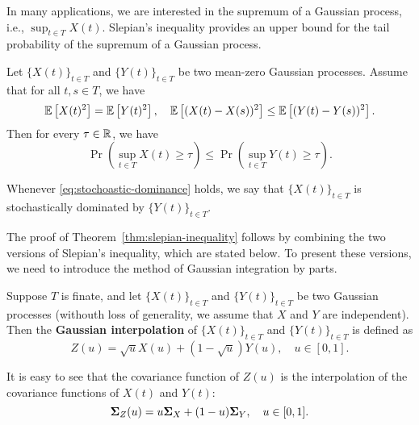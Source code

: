 In many applications, we are interested in the supremum of a Gaussian process, i.e., \(\sup_{t\in T}X(t)\). Slepian's inequality provides an upper bound for the tail probability of the supremum of a Gaussian process.

\begin{theorem}
    Let \(\{X(t)\}_{t\in T}\) and \(\{Y(t)\}_{t\in T}\) be two mean-zero Gaussian processes. Assume that for all \(t,s\in T\), we have
    \begin{equation*}
        {\mathbb E}\left[X(t)^{2}\right]={\mathbb E}\left[Y(t)^{2}\right],\quad {\mathbb E}\left[(X(t)-X(s))^{2}\right]\leq{\mathbb E}\left[(Y(t)-Y(s))^{2}\right].
    \end{equation*}
    Then for every \(\tau\in{\mathbb R}\), we have
    \begin{equation}
        \label{eq:stochoastic-dominance}
        \Pr\left(\sup_{t\in T}X(t)\geq\tau\right)\leq\Pr\left(\sup_{t\in T}Y(t)\geq\tau\right).
    \end{equation}
\end{theorem}

\begin{remark}
    Whenever \eqref{eq:stochoastic-dominance} holds, we say that \(\{X(t)\}_{t\in T}\) is stochastically dominated by \(\{Y(t)\}_{t\in T}\).
\end{remark}

The proof of Theorem~\ref{thm:slepian-inequality} follows by combining the two versions of Slepian's inequality, which are stated below. To present these versions, we need to introduce the method of Gaussian integration by parts.

\begin{definition}
    Suppose \(T\) is finate, and let \(\{X(t)\}_{t\in T}\) and \(\{Y(t)\}_{t\in T}\) be two Gaussian processes (withouth loss of generality, we assume that \(X\) and \(Y\) are independent). Then the \textbf{Gaussian interpolation} of \(\{X(t)\}_{t\in T}\) and \(\{Y(t)\}_{t\in T}\) is defined as
    \begin{equation*}
        Z(u)=\sqrt{u}X(u)+(1-\sqrt{u})Y(u),\quad u\in[0,1].
    \end{equation*}
\end{definition}

It is easy to see that the covariance function of \(Z(u)\) is the interpolation of the covariance functions of \(X(t)\) and \(Y(t)\):
\begin{equation*}
    \boldsymbol{\Sigma}_{Z}(u)=u\boldsymbol{\Sigma}_{X}+(1-u)\boldsymbol{\Sigma}_{Y},\quad u\in[0,1].
\end{equation*}

